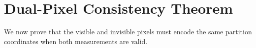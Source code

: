 \documentclass[11pt,twocolumn,a4paper]{article}
\begin{document}


\section{Dual-Pixel Consistency Theorem}\label{sec:consistency}

We now prove that the visible and invisible pixels must encode the same partition coordinates when both measurements are valid.
\end{document}
